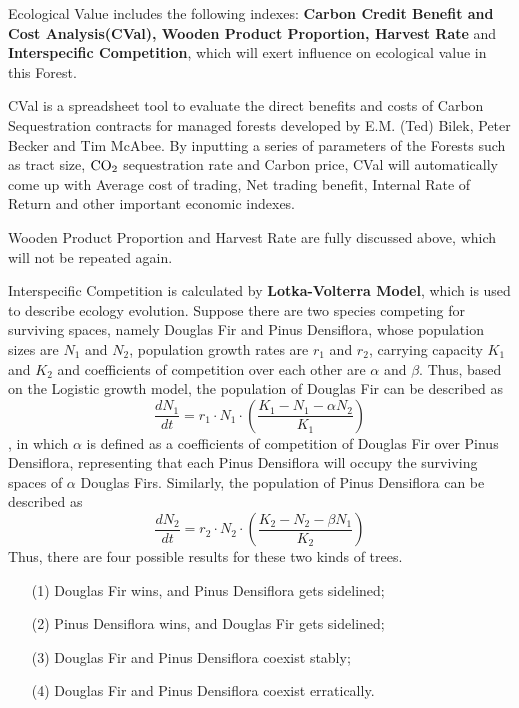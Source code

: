 \documentclass{mcmthesis}
\numberwithin{figure}{section}
\numberwithin{table}{section}
\numberwithin{equation}{section}
\begin{document}
Ecological Value includes the following indexes: \textbf{Carbon Credit Benefit and 
Cost Analysis(CVal), Wooden Product Proportion, Harvest Rate} and \textbf{Interspecific 
Competition}, which will exert influence on ecological value in this Forest.
\par
CVal is a spreadsheet tool to evaluate the direct benefits and costs of Carbon 
Sequestration contracts for managed forests developed by E.M. (Ted) Bilek,
Peter Becker and Tim McAbee. By inputting a series of parameters of the Forests
such as tract size, $ \rm{CO_2} $ sequestration rate and Carbon price, CVal will
automatically come up with Average cost of trading, Net trading benefit, 
Internal Rate of Return and other important economic indexes. 
\par
Wooden Product Proportion and Harvest Rate are fully discussed above, which will not
be repeated again.
\par
Interspecific Competition is calculated by \textbf{Lotka-Volterra Model}, which is 
used to describe ecology evolution.
Suppose there are two species competing for surviving spaces, namely
Douglas Fir and Pinus Densiflora, whose population sizes are $ N_1 $ and $ N_2 $, population growth rates
are $ r_1 $ and $ r_2 $, carrying capacity $ K_1 $ and $ K_2 $ and coefficients of competition over each other 
are $ \alpha $ and $ \beta $. 
Thus, based on the Logistic growth model, the population of Douglas Fir
can be described as 
$$
  \frac{dN_1}{dt} = r_1\cdot N_1\cdot (\frac{K_1-N_1-\alpha N_2}{K_1})
$$ 
, in which $ \alpha $ is defined as a coefficients of competition of Douglas Fir over Pinus Densiflora,
representing that each Pinus Densiflora will occupy the surviving spaces of
 $ \alpha $ Douglas Firs.
 Similarly, the population of Pinus Densiflora can be described as $$
 \frac{dN_2}{dt} = r_2\cdot N_2\cdot (\frac{K_2-N_2-\beta N_1}{K_2})
 $$ 
Thus, there are four possible results for these two kinds of trees.
\begin{enumerate}
  \item [(1)] Douglas Fir wins, and Pinus Densiflora gets sidelined;
  \item [(2)] Pinus Densiflora wins, and Douglas Fir gets sidelined;
  \item [(3)] Douglas Fir and Pinus Densiflora coexist stably;
  \item [(4)] Douglas Fir and Pinus Densiflora coexist erratically.
\end{enumerate}
\end{document}
